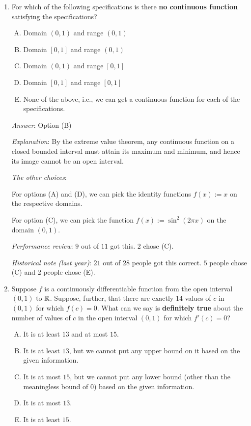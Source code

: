 \documentclass[10pt]{amsart}
\begin{document}
\begin{enumerate}
  {\em Performance review}: $9$ out of $11$ got this. $1$ chose (A)
  and $1$ chose (C).

  {\em Historical note (last year)}: $16$ out of $28$ people got this
  correct. $7$ people chose (A), $2$ people each chose (C) and (E),
  and $1$ person chose (D).
\item For which of the following specifications is there {\bf no
  continuous function} satisfying the specifications? 

  \begin{enumerate}[(A)]
  \item Domain $(0,1)$ and range $(0,1)$
  \item Domain $[0,1]$ and range $(0,1)$
  \item Domain $(0,1)$ and range $[0,1]$
  \item Domain $[0,1]$ and range $[0,1]$
  \item None of the above, i.e., we can get a continuous function for
    each of the specifications.
  \end{enumerate}

  {\em Answer}: Option (B)

  {\em Explanation}: By the extreme value theorem, any continuous
  function on a closed bounded interval must attain its maximum and
  minimum, and hence its image cannot be an open interval.

  {\em The other choices}:

  For options (A) and (D), we can pick the identity functions $f(x) :=
  x$ on the respective domains.

  For option (C), we can pick the function $f(x) := \sin^2(2\pi x)$ on
  the domain $(0,1)$. 

  {\em Performance review}: $9$ out of $11$ got this. $2$ chose (C).

  {\em Historical note (last year)}: $21$ out of $28$ people got this
  correct. $5$ people chose (C) and $2$ people chose (E).

\item Suppose $f$ is a continuously differentiable function from the
  open interval $(0,1)$ to $\mathbb{R}$. Suppose, further, that there are
  exactly $14$ values of $c$ in $(0,1)$ for which $f(c) = 0$. What can
  we say is {\bf definitely true} about the number of values of $c$ in
  the open interval $(0,1)$ for which $f'(c) = 0$? 

  \begin{enumerate}[(A)]
  \item It is at least $13$ and at most $15$.
  \item It is at least $13$, but we cannot put any upper bound on it
    based on the given information.
  \item It is at most $15$, but we cannot put any lower bound (other
  than the meaningless bound of $0$) based on the given information.
  \item It is at most $13$.
  \item It is at least $15$.
  \end{enumerate}


\end{enumerate}
\end{document}
